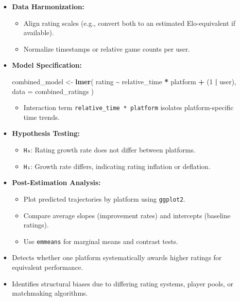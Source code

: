 \documentclass[
]{article}
\newenvironment{Shaded}{\begin{snugshade}}{\end{snugshade}}
\newcommand{\AttributeTok}[1]{\textcolor[rgb]{0.13,0.29,0.53}{#1}}
\newcommand{\DecValTok}[1]{\textcolor[rgb]{0.00,0.00,0.81}{#1}}
\newcommand{\FunctionTok}[1]{\textcolor[rgb]{0.13,0.29,0.53}{\textbf{#1}}}
\newcommand{\NormalTok}[1]{#1}
\newcommand{\OtherTok}[1]{\textcolor[rgb]{0.56,0.35,0.01}{#1}}
\newcommand{\SpecialCharTok}[1]{\textcolor[rgb]{0.81,0.36,0.00}{\textbf{#1}}}
\providecommand{\tightlist}{%
  \setlength{\itemsep}{0pt}\setlength{\parskip}{0pt}}
\begin{document}
\begin{itemize}
\item
  \textbf{Data Harmonization:}

  \begin{itemize}
  \tightlist
  \item
    Align rating scales (e.g., convert both to an estimated
    Elo-equivalent if available).
  \item
    Normalize timestamps or relative game counts per user.
  \end{itemize}
\item
  \textbf{Model Specification:}

\begin{Shaded}
\begin{Highlighting}[]
\NormalTok{combined\_model }\OtherTok{\textless{}{-}} \FunctionTok{lmer}\NormalTok{(}
\NormalTok{  rating }\SpecialCharTok{\textasciitilde{}}\NormalTok{ relative\_time }\SpecialCharTok{*}\NormalTok{ platform }\SpecialCharTok{+}\NormalTok{ (}\DecValTok{1} \SpecialCharTok{|}\NormalTok{ user),}
  \AttributeTok{data =}\NormalTok{ combined\_ratings}
\NormalTok{)}
\end{Highlighting}
\end{Shaded}

  \begin{itemize}
  \tightlist
  \item
    Interaction term \texttt{relative\_time\ *\ platform} isolates
    platform-specific time trends.
  \end{itemize}
\item
  \textbf{Hypothesis Testing:}

  \begin{itemize}
  \tightlist
  \item
    \texttt{H₀}: Rating growth rate does not differ between platforms.
  \item
    \texttt{H₁}: Growth rate differs, indicating rating inflation or
    deflation.
  \end{itemize}
\item
  \textbf{Post-Estimation Analysis:}

  \begin{itemize}
  \tightlist
  \item
    Plot predicted trajectories by platform using \texttt{ggplot2}.
  \item
    Compare average slopes (improvement rates) and intercepts (baseline
    ratings).
  \item
    Use \texttt{emmeans} for marginal means and contrast tests.
  \end{itemize}
\item
  Detects whether one platform systematically awards higher ratings for
  equivalent performance.
\item
  Identifies structural biases due to differing rating systems, player
  pools, or matchmaking algorithms.
\end{itemize}
\end{document}
